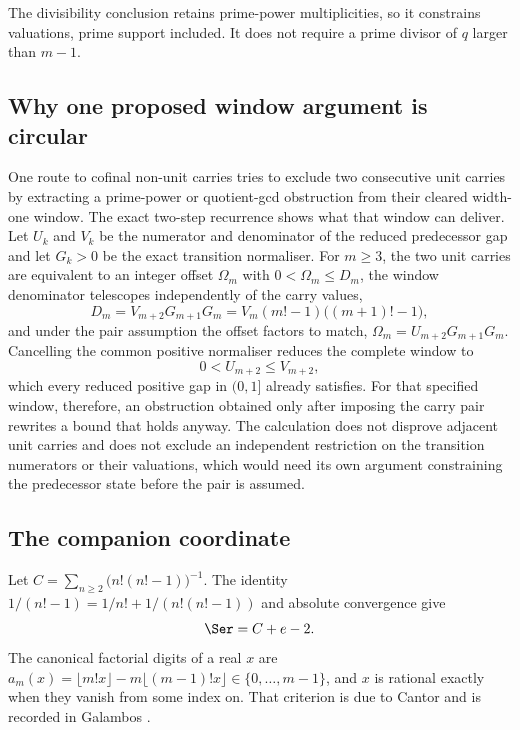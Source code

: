 The divisibility conclusion retains prime-power multiplicities, so it
constrains valuations, prime support included.  It does not require a
prime divisor of $q$ larger than $m-1$.

\subsection{Why one proposed window argument is circular}
\label{long68:sec:adjacent-unit-no-go}

One route to cofinal non-unit carries tries to exclude two consecutive unit
carries by extracting a prime-power or quotient-gcd obstruction from their
cleared width-one window.  The exact two-step recurrence shows what that
window can deliver.  Let $U_k$ and $V_k$ be the numerator and denominator of
the reduced predecessor gap and let $G_k>0$ be the exact transition
normaliser.  For $m\ge3$, the two unit carries are equivalent to an integer
offset $\Omega_m$ with $0<\Omega_m\le D_m$, the window denominator telescopes
independently of the carry values,
\[
 D_m=V_{m+2}G_{m+1}G_m=V_m(m!-1)\bigl((m+1)!-1\bigr),
\]
and under the pair assumption the offset factors to match,
$\Omega_m=U_{m+2}G_{m+1}G_m$.  Cancelling the common positive normaliser
reduces the complete window to
\[
 0<U_{m+2}\le V_{m+2},
\]
which every reduced positive gap in $(0,1]$ already satisfies.  For that
specified window, therefore, an obstruction obtained only after imposing the
carry pair rewrites a bound that holds anyway.  The calculation does not
disprove adjacent unit carries and does not exclude an independent
restriction on the transition numerators or their valuations, which would
need its own argument constraining the predecessor state before the pair is
assumed.

\subsection{The companion coordinate}

Let $C=\sum_{n\ge2}\bigl(n!(n!-1)\bigr)^{-1}$.  The identity
$1/(n!-1)=1/n!+1/(n!(n!-1))$ and absolute convergence give
\begin{equation}\label{long68:eq:companion-decomposition}
 \Ser=C+e-2 .
\end{equation}
The canonical factorial digits of a real $x$ are
$a_m(x)=\lfloor m!x\rfloor-m\lfloor(m-1)!x\rfloor\in\{0,\ldots,m-1\}$, and
$x$ is rational exactly when they vanish from some index on.  That criterion
is due to Cantor \cite{cantor1869} and is recorded in Galambos
\cite[Ch.~1]{galambos1976}.

